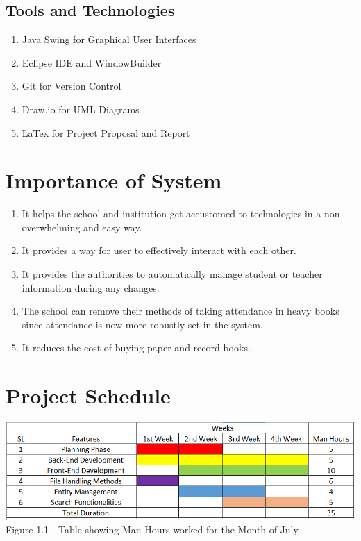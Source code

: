 \documentclass[a4paper,12pt]{article}
\begin{document}
\subsection{Tools and Technologies}
\enlargethispage{\baselineskip}

\begin{enumerate}
    \item Java Swing for Graphical User Interfaces
    \item Eclipse IDE and WindowBuilder 
    \item Git for Version Control
    \item Draw.io for UML Diagrams
    \item LaTex for Project Proposal and Report
\end{enumerate}
\newpage

\section{Importance of System}
\enlargethispage{\baselineskip}
\begin{enumerate}
    \item It helps the school and institution get accustomed to technologies in a non-overwhelming and easy way.
    \item It provides a way for user to effectively interact with each other.
    \item It provides the authorities to automatically manage student or teacher information during any changes.
    \item The school can remove their methods of taking attendance in heavy books since attendance is now more robustly set in the system.
    \item It reduces the cost of buying paper and record books.
\end{enumerate}



\section{Project Schedule}
\label{sec:projsec}
\enlargethispage{\baselineskip}
\begin{center}
    \includegraphics[width=15.2cm]{6.png}
    Figure 1.1 - Table showing Man Hours worked for the Month of July
\end{center}
\end{document}
